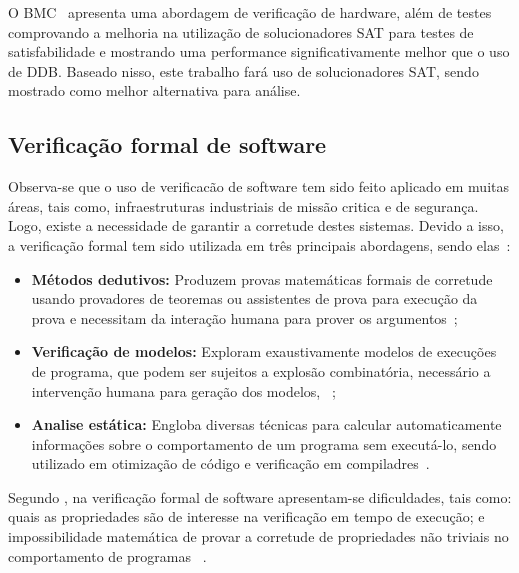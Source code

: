\par
O BMC~\cite{biere1999symbolic} apresenta uma abordagem de verificação de hardware, além de testes comprovando a melhoria na utilização de solucionadores SAT para testes de satisfabilidade e mostrando uma performance significativamente melhor que o uso de DDB\cite{biere1999symbolic}. Baseado nisso, este trabalho fará uso de solucionadores SAT, sendo mostrado como melhor alternativa para análise.
\subsection{Verificação formal de software}

Observa-se que o uso de verificacão de software tem sido feito aplicado em muitas áreas, tais como, infraestruturas industriais de missão critica e de segurança.  Logo, existe a necessidade de garantir a corretude destes sistemas. Devido a isso, a verificação formal tem sido utilizada em três principais abordagens, sendo elas~\cite{cousot2010gentle,d2008survey}:

\begin{itemize}
 \item \textbf{Métodos dedutivos:} Produzem provas matemáticas formais de corretude usando provadores de teoremas ou assistentes de prova para execução da prova e necessitam da interação humana para prover os argumentos~\cite{cousot2010gentle};
  \item \textbf{Verificação de modelos:} Exploram exaustivamente modelos de execuções de programa, que podem ser sujeitos a explosão combinatória, necessário a intervenção humana para geração dos modelos, \textcolor{red}{}~\cite{rocha2015verificaccao};
  \item \textbf{Analise estática:} Engloba diversas técnicas para calcular automaticamente informações sobre o comportamento de um programa sem executá-lo, sendo utilizado em otimização de código e verificação em compiladres~\cite{d2008survey}.
\end{itemize}

Segundo , na verificação formal de software apresentam-se dificuldades, tais como: quais as propriedades são de interesse na verificação em tempo de execução; e impossibilidade matemática de provar a corretude de propriedades não triviais no comportamento de programas 
~\cite{cousot2010gentle}. 

